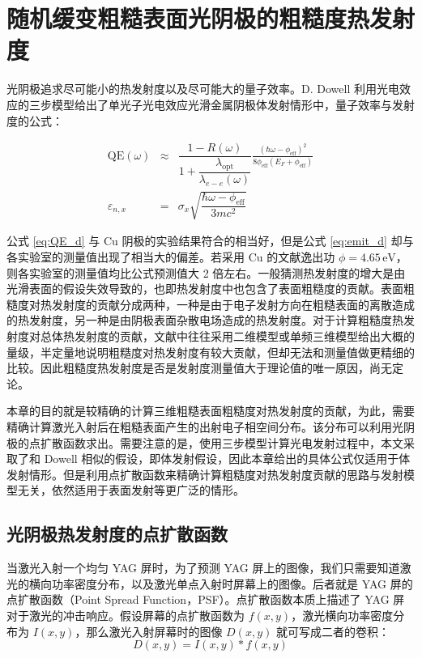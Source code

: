 \chapter{随机缓变粗糙表面光阴极的粗糙度热发射度}
\label{chap:roughness}

光阴极追求尽可能小的热发射度以及尽可能大的量子效率。D. Dowell 利用光电效应的三步模型给出了单光子光电效应光滑金属阴极体发射情形中，量子效率与发射度的公式：

\begin{eqnarray}
\text{QE}(\omega) &\approx& \dfrac{1-R(\omega)}{1+\dfrac{\lambda_{\text{opt}}}{\lambda_{e-e}(\omega)}}\frac{(\hbar\omega-\phi_{\text{eff}})^2}{8\phi_{\text{eff}}(E_F+\phi_{\text{eff}})}\label{eq:QE_d}\\
\varepsilon_{n,x} &=& \sigma_x\sqrt{\dfrac{\hbar\omega-\phi_{\text{eff}}}{3mc^2}}\label{eq:emit_d}
\end{eqnarray}

公式 \ref{eq:QE_d} 与 Cu 阴极的实验结果符合的相当好，但是公式 \ref{eq:emit_d} 却与各实验室的测量值出现了相当大的偏差。若采用 Cu 的文献逸出功 $\phi=4.65\,\text{eV}$，则各实验室的测量值均比公式预测值大 2 倍左右。一般猜测热发射度的增大是由光滑表面的假设失效导致的，也即热发射度中也包含了表面粗糙度的贡献。表面粗糙度对热发射度的贡献分成两种，一种是由于电子发射方向在粗糙表面的离散造成的热发射度，另一种是由阴极表面杂散电场造成的热发射度。对于计算粗糙度热发射度对总体热发射度的贡献，文献中往往采用二维模型或单频三维模型给出大概的量级，半定量地说明粗糙度对热发射度有较大贡献，但却无法和测量值做更精细的比较。因此粗糙度热发射度是否是发射度测量值大于理论值的唯一原因，尚无定论。

本章的目的就是较精确的计算三维粗糙表面粗糙度对热发射度的贡献，为此，需要精确计算激光入射后在粗糙表面产生的出射电子相空间分布。该分布可以利用光阴极的点扩散函数求出。需要注意的是，使用三步模型计算光电发射过程中，本文采取了和 Dowell 相似的假设，即体发射假设，因此本章给出的具体公式仅适用于体发射情形。但是利用点扩散函数来精确计算粗糙度对热发射度贡献的思路与发射模型无关，依然适用于表面发射等更广泛的情形。

\section{\label{s:psf}光阴极热发射度的点扩散函数}
当激光入射一个均匀 YAG 屏时，为了预测 YAG 屏上的图像，我们只需要知道激光的横向功率密度分布，以及激光单点入射时屏幕上的图像。后者就是 YAG 屏的点扩散函数（Point Spread Function，PSF）。点扩散函数本质上描述了 YAG 屏对于激光的冲击响应。假设屏幕的点扩散函数为 $f(x, y)$，激光横向功率密度分布为 $I(x, y)$，那么激光入射屏幕时的图像 $D(x, y)$ 就可写成二者的卷积：
\begin{equation}
D(x, y) = I(x, y) * f(x, y)
\label{eq:PSF}
\end{equation}


